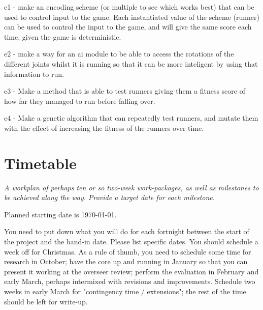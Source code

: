 \documentclass[12pt,a4paper,twoside]{article}
\begin{document}
e1 - make an encoding scheme (or multiple to see which works best) that can be used to control input to the game. Each instantiated value of the scheme (runner) can be used to control the input to the game, and will give the same score each time, given the game is deterministic.

e2 - make a way for an ai module to be able to access the rotations of the different joints whilst it is running so that it can be more inteligent by using that information to run.

e3 - Make a method that is able to test runners giving them a fitness score of how far they managed to run before falling over.

e4 - Make a genetic algorithm that can repeatedly test runners, and mutate them with the effect of increasing the fitness of the runners over time.


\section*{Timetable} \emph {A workplan of perhaps ten or so two-week work-packages, as well as milestones to be achieved along the way. Provide a target date for each milestone.}

Planned starting date is \today.

You need to put down what you will do for each fortnight between the start of the project and the hand-in date. Please list specific dates. You should schedule a week off for Christmas. As a rule of thumb, you need to schedule some time for research in October; have the core up and running in January so that you can present it working at the overseer review; perform the evaluation in February and early March, perhaps intermixed with revisions and improvements. Schedule two weeks in early March for "contingency time / extensions"; the rest of the time should be left for write-up.
\end{document}
